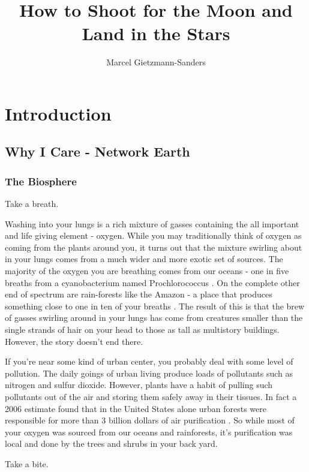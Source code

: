 \documentclass[11pt,a5paper]{book}
\title{How to Shoot for the Moon and Land in the Stars}
\author{Marcel Gietzmann-Sanders}
\date{}
\begin{document}
\maketitle
\tableofcontents
\newpage
\part{Introduction}
\chapter{Why I Care - Network Earth}
\section{The Biosphere}
Take a breath. 
\newline

Washing into your lungs is a rich mixture of gasses containing the all important and life giving element - oxygen. While you may traditionally think of oxygen as coming from the plants around you, it turns out that the mixture swirling about in your lungs comes from a much wider and more exotic set of sources. The majority of the oxygen you are breathing comes from our oceans - one in five breaths from a cyanobacterium named Prochlorococcus \cite{kmorsink}. On the complete other end of spectrum are rain-forests like the Amazon - a place that produces something close to one in ten of your breaths \cite{ymalhi}. The result of this is that the brew of gasses swirling around in your lungs has come from creatures smaller than the single strands of hair on your head to those as tall as multistory buildings. However, the story doesn't end there.
\newline

If you're near some kind of urban center, you probably deal with some level of pollution. The daily goings of urban living produce loads of pollutants such as nitrogen and sulfur dioxide. However, plants have a habit of pulling such pollutants out of the air and storing them safely away in their tissues. In fact a 2006 estimate found that in the United States alone urban forests were responsible for more than 3 billion dollars of air purification \cite{dnowak}. So while most of your oxygen was sourced from our oceans and rainforests, it's purification was local and done by the trees and shrubs in your back yard. 
\newline

Take a bite. 
\newline 
\end{document}
